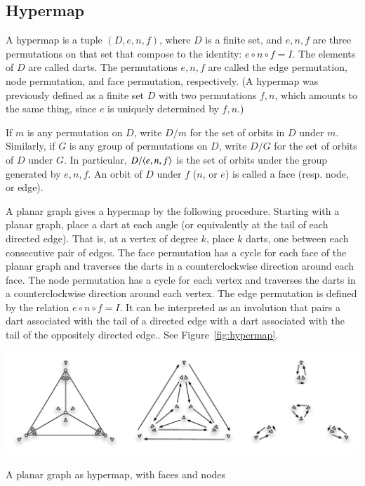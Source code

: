 \documentclass{article} %
\begin{document}
\subsection{Hypermap}

A hypermap is a tuple $(D,e,n,f)$, where $D$ is a finite
set, and $e,n,f$ are three permutations on that set that
compose to the identity:
$e\circ n\circ f = I$.  The elements of $D$ are called darts.
The permutations $e,n,f$ are called the edge permutation,
node permutation, and face permutation, respectively.
(A hypermap was previously defined as a finite set $D$ with
two permutations $f,n$, which amounts to the same thing,
since $e$ is uniquely determined by $f,n$.)

If $m$ is any permutation on $D$, write $D/m$ for the
set of orbits in $D$ under $m$.  Similarly, if $G$ is any
group of permutations on $D$, write $D/G$ for the set
of orbits of $D$ under $G$.  In particular, $D/\langle e,n,f\rangle$
is the set of orbits under the group generated by $e,n,f$.
An orbit of $D$ under $f$ ($n$, or $e$) is called a face (resp.
node, or edge).

A planar graph gives a hypermap
by the following procedure.  Starting with a planar graph,
place a dart at each angle (or equivalently at the tail of each
directed edge).  That is, at a vertex of degree $k$,
place $k$ darts, one between each consecutive pair of edges.
The face permutation has a cycle for
each face of the planar graph and  traverses the
darts in a counterclockwise direction around each face.
The node permutation has a cycle for each vertex and traverses
the darts in a counterclockwise direction around each vertex.
The edge permutation is defined by the relation $e\circ n\circ f=I$.
It can be interpreted as an involution that pairs a dart associated
with the tail of a directed edge with a dart associated with the tail
of the oppositely directed edge..
See Figure~\ref{fig:hypermap}.

\begin{Figure}[htb]
  \begin{center}
    \includegraphics[scale=0.50]{images/hyper.pdf}
   \end{center}
  \caption{A planar graph as hypermap, with faces and nodes}
  \label{fig:hypermap}
\end{Figure}
\end{document}
